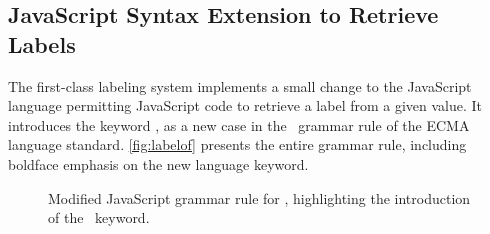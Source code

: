 \subsection{JavaScript Syntax Extension to Retrieve Labels}

The first-class labeling system implements a small change to the JavaScript language permitting JavaScript code to retrieve a label from a given value.
It introduces the keyword \mlabelof, as a new case in the \UnaryExpression\ grammar rule of the ECMA~\cite{ecma} language standard.
\autoref{fig:labelof} presents the entire grammar rule, including boldface emphasis on the new language keyword.

\begin{figure}[ht]
  \centering
{}
  \caption{Modified JavaScript grammar rule for \UnaryExpression, highlighting the introduction of the \mlabelof\ keyword.}
  \label{fig:labelof}
\end{figure}
\vspace*{-\baselineskip}

